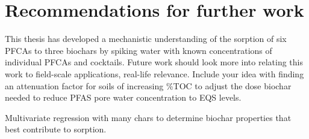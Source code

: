 \chapter{Recommendations for further work}\label{chap:furtherwork}

This thesis has developed a mechanistic understanding of the sorption of six PFCAs to three biochars by spiking water with known concentrations of individual PFCAs and cocktails. Future work should look more into relating this work to field-scale applications, real-life relevance. Include your idea with finding an attenuation factor for soils of increasing \%TOC to adjust the dose biochar needed to reduce PFAS pore water concentration to EQS levels. 

Multivariate regression with many chars to determine biochar properties that best contribute to sorption.
